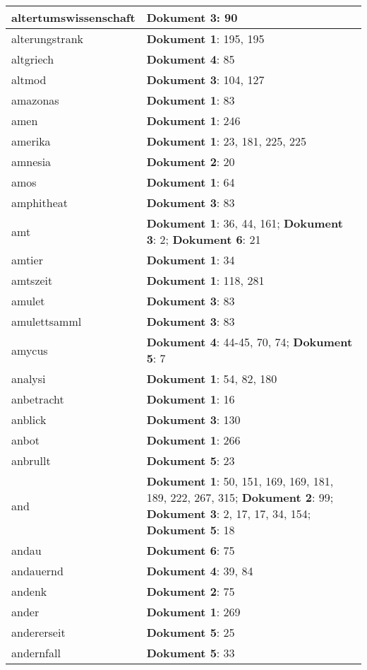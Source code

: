 \documentclass[a5paper]{article}
\begin{document}
\begin{longtable}[l]{|l|p{3in}|}
\hline
altertumswissenschaft & \textbf{Dokument 3}: 90 \\
\hline
alterungstrank & \textbf{Dokument 1}: 195, 195 \\
\hline
altgriech & \textbf{Dokument 4}: 85 \\
\hline
altmod & \textbf{Dokument 3}: 104, 127 \\
\hline
amazonas & \textbf{Dokument 1}: 83 \\
\hline
amen & \textbf{Dokument 1}: 246 \\
\hline
amerika & \textbf{Dokument 1}: 23, 181, 225, 225 \\
\hline
amnesia & \textbf{Dokument 2}: 20 \\
\hline
amos & \textbf{Dokument 1}: 64 \\
\hline
amphitheat & \textbf{Dokument 3}: 83 \\
\hline
amt & \textbf{Dokument 1}: 36, 44, 161; \textbf{Dokument 3}: 2; \textbf{Dokument 6}: 21 \\
\hline
amtier & \textbf{Dokument 1}: 34 \\
\hline
amtszeit & \textbf{Dokument 1}: 118, 281 \\
\hline
amulet & \textbf{Dokument 3}: 83 \\
\hline
amulettsamml & \textbf{Dokument 3}: 83 \\
\hline
amycus & \textbf{Dokument 4}: 44-45, 70, 74; \textbf{Dokument 5}: 7 \\
\hline
analysi & \textbf{Dokument 1}: 54, 82, 180 \\
\hline
anbetracht & \textbf{Dokument 1}: 16 \\
\hline
anblick & \textbf{Dokument 3}: 130 \\
\hline
anbot & \textbf{Dokument 1}: 266 \\
\hline
anbrullt & \textbf{Dokument 5}: 23 \\
\hline
and & \textbf{Dokument 1}: 50, 151, 169, 169, 181, 189, 222, 267, 315; \textbf{Dokument 2}: 99; \textbf{Dokument 3}: 2, 17, 17, 34, 154; \textbf{Dokument 5}: 18 \\
\hline
andau & \textbf{Dokument 6}: 75 \\
\hline
andauernd & \textbf{Dokument 4}: 39, 84 \\
\hline
andenk & \textbf{Dokument 2}: 75 \\
\hline
ander & \textbf{Dokument 1}: 269 \\
\hline
andererseit & \textbf{Dokument 5}: 25 \\
\hline
andernfall & \textbf{Dokument 5}: 33 \\

\end{longtable}
\end{document}
